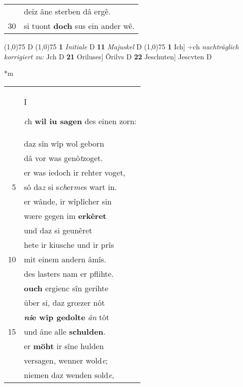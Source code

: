 \documentclass[8pt,a4paper,notitlepage]{article}
\begin{document}
\begin{table}[ht]
\begin{minipage}[t]{0.5\linewidth}
\begin{tabular}{rl}
 & deiz âne sterben dâ ergê.\\ 
30 & si tuont \textbf{doch} sus ein ander wê.\\ 
\end{tabular}
\scriptsize
\line(1,0){75} \newline
D \newline
\line(1,0){75} \newline
\textbf{1} \textit{Initiale} D  \textbf{11} \textit{Majuskel} D  \newline
\line(1,0){75} \newline
\textbf{1} Ich] ÷ch \textit{nachträglich korrigiert zu:} Jch D \textbf{21} Oriluses] Ôrilvs D \textbf{22} Jeschuten] Jescvten D \newline
\end{minipage}
\hspace{0.5cm}
\begin{minipage}[t]{0.5\linewidth}
\small
\begin{center}*m
\end{center}
\begin{tabular}{rl}
 & \begin{large}I\end{large}\textit{c}h \textbf{wil iu sagen} des einen zorn:\\ 
 & daz sîn wîp wol geborn\\ 
 & dâ vor was genô\textit{t}zoget.\\ 
 & er was iedoch ir rehter voget,\\ 
5 & sô da\textit{z} si s\textit{ch}er\textit{me}s wart in.\\ 
 & er wânde, ir wîplîcher sin\\ 
 & wære gegen im \textbf{erkêret}\\ 
 & und daz si geunêret\\ 
 & hete ir kiusche und ir prîs\\ 
10 & mit einem andern âmîs.\\ 
 & des lasters nam er pflihte.\\ 
 & \textbf{ouch} ergienc sîn gerihte\\ 
 & über si, daz grœzer nôt\\ 
 & \textbf{\textit{ni}e wîp gedolte} \textit{ân} tôt\\ 
15 & und âne alle \textbf{schulden}.\\ 
 & er \textbf{möht} ir sîne hulden\\ 
 & versagen, wenner wold\textit{e};\\ 
 & niemen daz wenden sold\textit{e},\\ 

\end{tabular}
\end{minipage}
\end{table}
\end{document}
